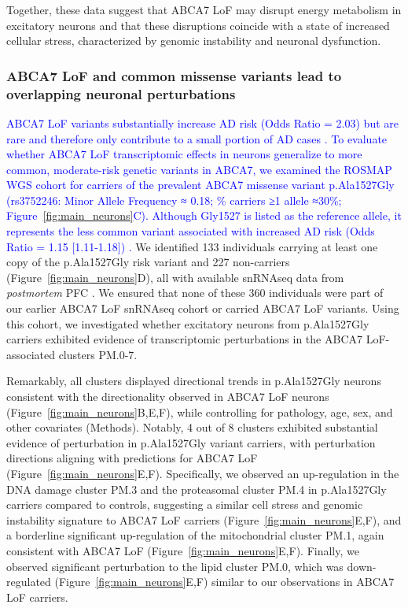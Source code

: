 Together, these data suggest that ABCA7 LoF may disrupt energy metabolism in excitatory neurons and that these disruptions coincide with a state of increased cellular stress, characterized by genomic instability and neuronal dysfunction.

\subsubsection{ABCA7 LoF and common missense variants lead to overlapping neuronal perturbations}
\newcommand{\quoteL}{\textcolor{blue}{ABCA7 LoF variants substantially increase AD risk (Odds Ratio = 2.03) \cite{Steinberg2015-mu} but are rare and therefore only contribute to a small portion of AD cases \cite{Duchateau2024-rf}. To evaluate whether ABCA7 LoF transcriptomic effects in neurons generalize to more common, moderate-risk genetic variants in ABCA7, we examined the ROSMAP WGS cohort for carriers of the prevalent ABCA7 missense variant p.Ala1527Gly (rs3752246: Minor Allele Frequency ≈ 0.18; \% carriers ≥1 allele ≈30\%; Figure~\ref{fig:main_neurons}C). Although Gly1527 is listed as the reference allele, it represents the less common variant associated with increased AD risk (Odds Ratio = 1.15 [1.11-1.18]) \cite{Kunkle2019-yo,Holstege2022-vp,Naj2011-bs}. \label{quoteL-label}}} 
\quoteL We identified 133 individuals carrying at least one copy of the p.Ala1527Gly risk variant and 227 non-carriers (Figure~\ref{fig:main_neurons}D), all with available snRNAseq data from \textit{postmortem} PFC \cite{Mathys2023-rs}. We ensured that none of these 360 individuals were part of our earlier ABCA7 LoF snRNAseq cohort or carried ABCA7 LoF variants. Using this cohort, we investigated whether excitatory neurons from p.Ala1527Gly carriers exhibited evidence of transcriptomic perturbations in the ABCA7 LoF-associated clusters PM.0-7.

Remarkably, all clusters displayed directional trends in p.Ala1527Gly neurons consistent with the directionality observed in ABCA7 LoF neurons (Figure~\ref{fig:main_neurons}B,E,F), while controlling for pathology, age, sex, and other covariates (Methods). Notably, 4 out of 8 clusters exhibited substantial evidence of perturbation in p.Ala1527Gly variant carriers, with perturbation directions aligning with predictions for ABCA7 LoF (Figure~\ref{fig:main_neurons}E,F). Specifically, we observed an up-regulation in the DNA damage cluster PM.3 and the proteasomal cluster PM.4 in p.Ala1527Gly carriers compared to controls, suggesting a similar cell stress and genomic instability signature to ABCA7 LoF carriers (Figure~\ref{fig:main_neurons}E,F), and a borderline significant up-regulation of the mitochondrial cluster PM.1, again consistent with ABCA7 LoF (Figure~\ref{fig:main_neurons}E,F). Finally, we observed significant perturbation to the lipid cluster PM.0, which was down-regulated (Figure~\ref{fig:main_neurons}E,F) similar to our observations in ABCA7 LoF carriers. 

